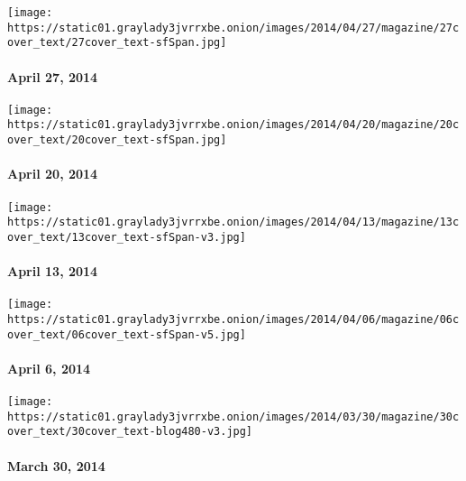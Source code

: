 \href{http://www.nytimes3xbfgragh.onion/indexes/2014/04/27/magazine/index.html}{}

\texttt{[image: https://static01.graylady3jvrrxbe.onion/images/2014/04/27/magazine/27cover\_text/27cover\_text-sfSpan.jpg]}

\hypertarget{april-27-2014}{%
\paragraph{April 27, 2014}\label{april-27-2014}}

\href{http://www.nytimes3xbfgragh.onion/indexes/2014/04/20/magazine/index.html}{}

\texttt{[image: https://static01.graylady3jvrrxbe.onion/images/2014/04/20/magazine/20cover\_text/20cover\_text-sfSpan.jpg]}

\hypertarget{april-20-2014}{%
\paragraph{April 20, 2014}\label{april-20-2014}}

\href{http://www.nytimes3xbfgragh.onion/indexes/2014/04/13/magazine/index.html}{}

\texttt{[image: https://static01.graylady3jvrrxbe.onion/images/2014/04/13/magazine/13cover\_text/13cover\_text-sfSpan-v3.jpg]}

\hypertarget{april-13-2014}{%
\paragraph{April 13, 2014}\label{april-13-2014}}

\href{http://www.nytimes3xbfgragh.onion/indexes/2014/04/06/magazine/index.html}{}

\texttt{[image: https://static01.graylady3jvrrxbe.onion/images/2014/04/06/magazine/06cover\_text/06cover\_text-sfSpan-v5.jpg]}

\hypertarget{april-6-2014}{%
\paragraph{April 6, 2014}\label{april-6-2014}}

\href{http://www.nytimes3xbfgragh.onion/indexes/2014/03/30/magazine/index.html}{}

\texttt{[image: https://static01.graylady3jvrrxbe.onion/images/2014/03/30/magazine/30cover\_text/30cover\_text-blog480-v3.jpg]}

\hypertarget{march-30-2014}{%
\paragraph{March 30, 2014}\label{march-30-2014}}

